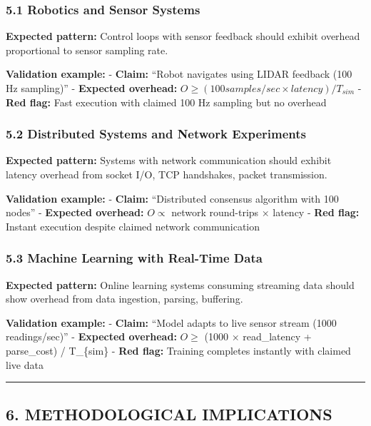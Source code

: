 \documentclass[
]{article}
\begin{document}
\subsubsection{5.1 Robotics and Sensor
Systems}\label{robotics-and-sensor-systems}

\textbf{Expected pattern:} Control loops with sensor feedback should
exhibit overhead proportional to sensor sampling rate.

\textbf{Validation example:} - \textbf{Claim:} ``Robot navigates using
LIDAR feedback (100 Hz sampling)'' - \textbf{Expected overhead:}
\(O \geq (100 samples/sec \times latency) / T_{sim}\) - \textbf{Red
flag:} Fast execution with claimed 100 Hz sampling but no overhead

\subsubsection{5.2 Distributed Systems and Network
Experiments}\label{distributed-systems-and-network-experiments}

\textbf{Expected pattern:} Systems with network communication should
exhibit latency overhead from socket I/O, TCP handshakes, packet
transmission.

\textbf{Validation example:} - \textbf{Claim:} ``Distributed consensus
algorithm with 100 nodes'' - \textbf{Expected overhead:} \(O \propto\)
network round-trips × latency - \textbf{Red flag:} Instant execution
despite claimed network communication

\subsubsection{5.3 Machine Learning with Real-Time
Data}\label{machine-learning-with-real-time-data}

\textbf{Expected pattern:} Online learning systems consuming streaming
data should show overhead from data ingestion, parsing, buffering.

\textbf{Validation example:} - \textbf{Claim:} ``Model adapts to live
sensor stream (1000 readings/sec)'' - \textbf{Expected overhead:}
\(O \geq\) (1000 × read\_latency + parse\_cost) / T\_\{sim\} -
\textbf{Red flag:} Training completes instantly with claimed live data

\begin{center}\rule{0.5\linewidth}{0.5pt}\end{center}

\subsection{6. METHODOLOGICAL
IMPLICATIONS}\label{methodological-implications}
\end{document}
